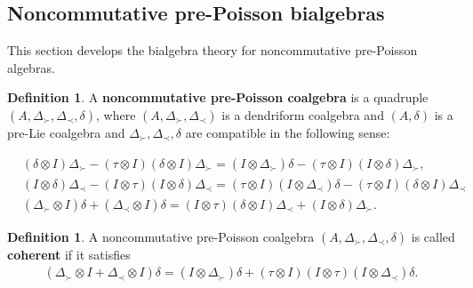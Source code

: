 \documentclass[12pt]{amsart}
\theoremstyle{definition}
\newtheorem{defi}[thm]{Definition}
\begin{document}
 \subsection{Noncommutative pre-Poisson bialgebras}
This section develops the bialgebra theory for noncommutative pre-Poisson algebras.
\begin{defi}  A {\bf noncommutative pre-Poisson coalgebra} is a quadruple
$(A,\Delta_{\succ},\Delta_{\prec},\delta)$, where $(A,\Delta_{\succ},\Delta_{\prec})$ is a dendriform coalgebra
and $(A,\delta)$ is a pre-Lie coalgebra and $\Delta_{\succ},\Delta_{\prec},\delta$ are compatible in the following sense:
\begin{small}
\begin{align}\label{Pc1}&(\delta\otimes I)\Delta_{\succ}-
(\tau\otimes I)(\delta\otimes I)\Delta_{\succ}=(I\otimes \Delta_{\succ})\delta
-(\tau\otimes I)(I\otimes \delta)\Delta_{\succ},\\&
\label{Pc2}(I\otimes \delta)\Delta_{\prec}-
(I\otimes \tau)(I\otimes \delta)\Delta_{\prec}=(\tau\otimes I)
(I\otimes \Delta_{\prec})\delta
-(\tau\otimes I)(\delta\otimes I)\Delta_{\prec}
\\&\label{Pc3}(\Delta_{\succ}\otimes I)\delta+(\Delta_{\prec}\otimes I)\delta=(I\otimes \tau)(\delta\otimes I)\Delta_{\prec}+
(I\otimes \delta)\Delta_{\succ}
.\end{align}
\end{small}
\end{defi}

\begin{defi} \label{Ac1} A noncommutative pre-Poisson coalgebra
$(A,\Delta_{\succ},\Delta_{\prec},\delta)$ is called {\bf coherent} if 
it satisfies
\begin{align}\label{Pc4}(\Delta_{\succ}\otimes I+\Delta_{\prec}\otimes I)\delta=(I\otimes \Delta_{\succ})\delta+
(\tau\otimes I)(I\otimes \tau)(I\otimes \Delta_{\prec})\delta.
\end{align}
\end{defi}
\end{document}
